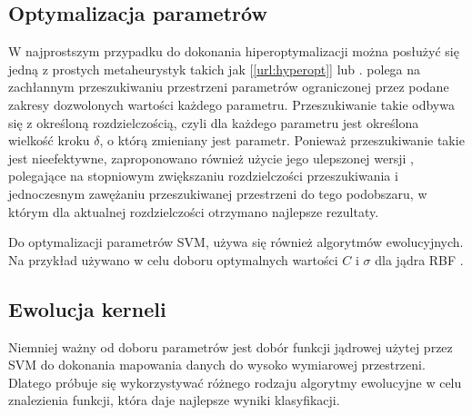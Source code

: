 \subsection{Optymalizacja parametrów}
\label{ssec:hyperopt}
W najprostszym przypadku do dokonania hiperoptymalizacji można posłużyć się jedną z prostych metaheurystyk takich jak  [\ref{url:hyperopt}] lub  \cite{practical_2003}.  polega na zachłannym przeszukiwaniu przestrzeni parametrów ograniczonej przez podane zakresy dozwolonych wartości każdego parametru. Przeszukiwanie takie odbywa się z określoną rozdzielczością, czyli dla każdego parametru jest określona wielkość kroku $ \delta $, o którą zmieniany jest parametr. Ponieważ przeszukiwanie takie jest nieefektywne, zaproponowano również użycie jego ulepszonej wersji \cite{staelin_parameter_2003}, polegające na stopniowym zwiększaniu rozdzielczości przeszukiwania i jednoczesnym zawężaniu przeszukiwanej przestrzeni do tego podobszaru, w którym dla aktualnej rozdzielczości otrzymano najlepsze rezultaty.


Do optymalizacji parametrów SVM, używa się również algorytmów ewolucyjnych. Na przykład używano  w celu doboru optymalnych wartości $ C $ i $ \sigma $ dla jądra RBF \cite{runarsson_asynchronous_2004}.

\subsection{Ewolucja kerneli} 
Niemniej ważny od doboru parametrów jest dobór funkcji jądrowej użytej przez SVM do dokonania mapowania danych do wysoko wymiarowej przestrzeni. Dlatego próbuje się wykorzystywać różnego rodzaju algorytmy ewolucyjne w celu znalezienia funkcji, która daje najlepsze wyniki klasyfikacji.

